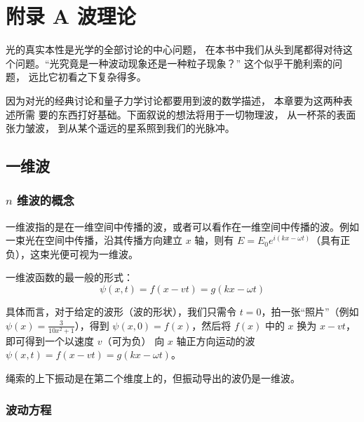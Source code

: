 \documentclass[UTF8]{report}
\theoremstyle{MyLineTheoremStyle} %
\theoremstyle{MyBlockTheoremStyle} %
\theoremstyle{MySubsubsectionStyle} %
\begin{document}
\chapter*{附录 A\hspace*{20pt} 波理论}
\setcounter{chapter}{1}   
\setcounter{equation}{0}    %
\thispagestyle{fancy} 
\setcounter{section}{0}
\renewcommand\thesection{A.\arabic{section}}   
\renewcommand{\thefigure}{A.\arabic{figure}} 
\renewcommand{\thetable}{A.\arabic{table}}


光的真实本性是光学的全部讨论的中心问题， 在本书中我们从头到尾都得对待这个问题。“光究竟是一种波动现象还是一种粒子现象？” 这个似乎干脆利索的问题， 远比它初看之下复杂得多。

因为对光的经典讨论和量子力学讨论都要用到波的数学描述， 本章要为这两种表述所需
要的东西打好基础。下面叙说的想法将用于一切物理波， 从一杯茶的表面张力皱波， 到从某个遥远的星系照到我们的光脉冲。

\section{一维波}

\subsection{$n$ 维波的概念}

一维波指的是在一维空间中传播的波，或者可以看作在一维空间中传播的波。例如一束光在空间中传播，沿其传播方向建立 $x$ 轴，则有 $E = E_0 e^{i(kx - \omega t)}$（具有正负），这束光便可视为一维波。

一维波函数的最一般的形式：
\begin{equation}
\psi(x,t) = f(x-vt) = g(kx - \omega t)
\end{equation}

具体而言，对于给定的波形（波的形状），我们只需令 $t=0$，拍一张“照片”（例如 $\psi(x) = \frac{3}{10x^2+1}$），得到 $\psi(x,0) = f(x)$，然后将 $f(x)$ 中的 $x$ 换为 $x-vt$，即可得到一个以速度 $v$（可为负） 向 $x$ 轴正方向运动的波 $\psi(x,t) = f(x - vt) = g(kx - \omega t)$。
{\par\color{gray}\small
绳索的上下振动是在第二个维度上的，但振动导出的波仍是一维波。
\par}


\subsection{波动方程}
\end{document}

